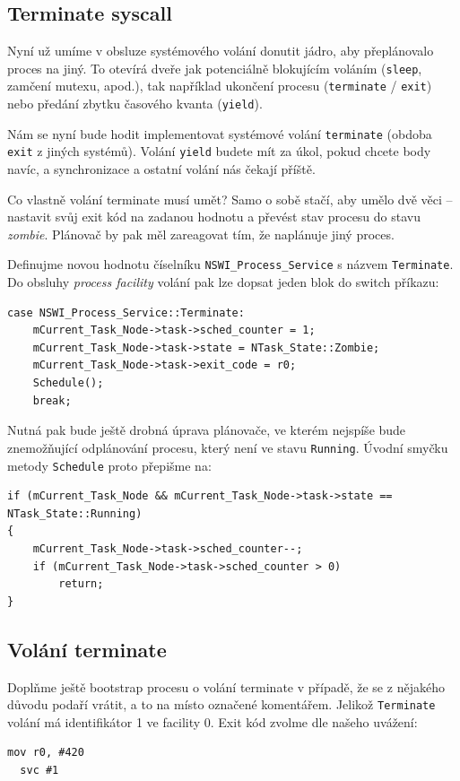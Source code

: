 \documentclass{article}
\begin{document}
\subsection{Terminate syscall}

Nyní už umíme v obsluze systémového volání donutit jádro, aby přeplánovalo proces na jiný. To otevírá dveře jak potenciálně blokujícím voláním ({\tt sleep}, zamčení mutexu, apod.), tak například ukončení procesu ({\tt terminate} / {\tt exit}) nebo předání zbytku časového kvanta ({\tt yield}).

Nám se nyní bude hodit implementovat systémové volání {\tt terminate} (obdoba {\tt exit} z jiných systémů). Volání {\tt yield} budete mít za úkol, pokud chcete body navíc, a synchronizace a ostatní volání nás čekají příště.

Co vlastně volání terminate musí umět? Samo o sobě stačí, aby umělo dvě věci -- nastavit svůj exit kód na zadanou hodnotu a převést stav procesu do stavu \emph{zombie}. Plánovač by pak měl zareagovat tím, že naplánuje jiný proces.

Definujme novou hodnotu číselníku {\tt NSWI\_Process\_Service} s názvem {\tt Terminate}. Do obsluhy \emph{process facility} volání pak lze dopsat jeden blok do switch příkazu:
\begin{lstlisting}
case NSWI_Process_Service::Terminate:
    mCurrent_Task_Node->task->sched_counter = 1;
    mCurrent_Task_Node->task->state = NTask_State::Zombie;
    mCurrent_Task_Node->task->exit_code = r0;
    Schedule();
    break;
\end{lstlisting}

Nutná pak bude ještě drobná úprava plánovače, ve kterém nejspíše bude  znemožňující odplánování procesu, který není ve stavu \texttt{Running}. Úvodní smyčku metody \texttt{Schedule} proto přepišme na:
\begin{lstlisting}
if (mCurrent_Task_Node && mCurrent_Task_Node->task->state == NTask_State::Running)
{
    mCurrent_Task_Node->task->sched_counter--;
    if (mCurrent_Task_Node->task->sched_counter > 0)
        return;
}
\end{lstlisting}

\subsection{Volání terminate}


Doplňme ještě bootstrap procesu o volání terminate v případě, že se z nějakého důvodu podaří vrátit, a to na místo označené komentářem. Jelikož \texttt{Terminate} volání má identifikátor 1 ve facility 0. Exit kód zvolme dle našeho uvážení: 
\begin{lstlisting}[language={[ARM]Assembler}]
  mov r0, #420
  svc #1
\end{lstlisting}
\end{document}
